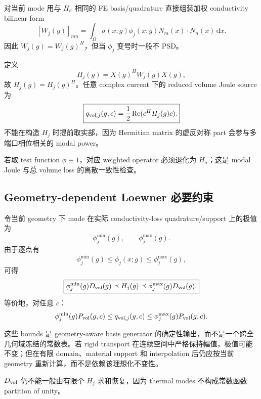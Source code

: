 对当前 mode 用与 $H_\sigma$ 相同的 FE basis/quadrature 直接组装加权 conductivity bilinear form
\begin{equation}
\boxed{
[W_j(g)]_{mn}
=\int_\Omega\sigma(x;g)\phi_j(x;g)N_m(x)\cdot N_n(x)\,\mathrm dx.
}
\end{equation}
因此 $W_j(g)=W_j(g)^H$，但当 $\phi_j$ 变号时一般不 PSD。

定义
\begin{equation}
\boxed{H_j(g)=X(g)^HW_j(g)X(g),}
\end{equation}
故 $H_j(g)=H_j(g)^H$。任意 complex current 下的 reduced volume Joule source 为
\begin{equation}
\boxed{
q_{{\rm vol},j}(g,c)
=\frac12\operatorname{Re}(c^HH_j(g)c).
}
\end{equation}
不能在构造 $H_j$ 时提前取实部，因为 Hermitian matrix 的虚反对称 part 会参与多端口相位相关的 modal power。

若取 test function $\phi\equiv1$，对应 weighted operator 必须退化为 $H_\sigma$；这是 modal Joule 与总 volume loss 的离散一致性检查。

\subsection{Geometry-dependent Loewner 必要约束}
令当前 geometry 下 mode 在实际 conductivity-loss quadrature/support 上的极值为
\begin{equation}
\phi_j^{\min}(g),\qquad\phi_j^{\max}(g).
\end{equation}
由于逐点有
\begin{equation}
\phi_j^{\min}(g)\le\phi_j(x;g)\le\phi_j^{\max}(g),
\end{equation}
可得
\begin{equation}
\boxed{
\phi_j^{\min}(g)D_{\rm vol}(g)
\preceq H_j(g)
\preceq
\phi_j^{\max}(g)D_{\rm vol}(g).
}
\end{equation}
等价地，对任意 $c$：
\begin{equation}
\phi_j^{\min}(g)P_{\rm vol}(g,c)
\le q_{{\rm vol},j}(g,c)
\le\phi_j^{\max}(g)P_{\rm vol}(g,c).
\end{equation}

这些 bounds 是 geometry-aware basis generator 的确定性输出，而不是一个跨全几何域冻结的常数表。若 rigid transport 在连续空间中严格保持幅值，极值可能不变；但在有限 domain、material support 和 interpolation 后仍应按当前 geometry 重新计算，而不是依赖该理想化不变性。

$D_{\rm vol}$ 仍不能一般由有限个 $H_j$ 求和恢复，因为 thermal modes 不构成常数函数 partition of unity。

